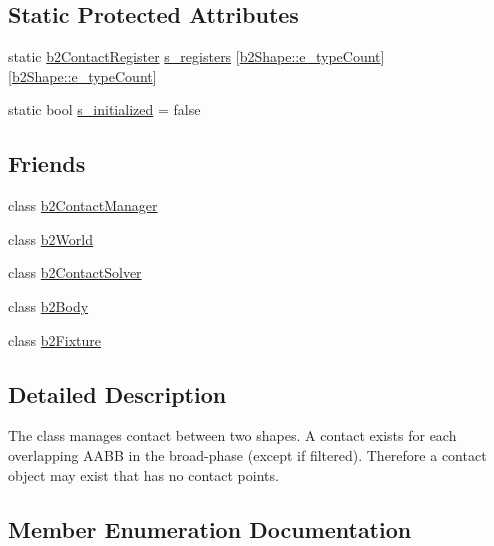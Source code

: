\subsection*{Static Protected Attributes}
\begin{DoxyCompactItemize}
\item 
static \mbox{\hyperlink{structb2_contact_register}{b2\+Contact\+Register}} \mbox{\hyperlink{classb2_contact_a5e2beb4e435e1545ae043a7a2b77d1da}{s\+\_\+registers}} \mbox{[}\mbox{\hyperlink{classb2_shape_a4c1f3a9ad6b3150bb90ad9018ca4b1e0aad7c674a33e8ca4ee9b717f226553596}{b2\+Shape\+::e\+\_\+type\+Count}}\mbox{]}\mbox{[}\mbox{\hyperlink{classb2_shape_a4c1f3a9ad6b3150bb90ad9018ca4b1e0aad7c674a33e8ca4ee9b717f226553596}{b2\+Shape\+::e\+\_\+type\+Count}}\mbox{]}
\item 
static bool \mbox{\hyperlink{classb2_contact_a672598c350694d7b9a89c45f8ad0dd90}{s\+\_\+initialized}} = false
\end{DoxyCompactItemize}
\subsection*{Friends}
\begin{DoxyCompactItemize}
\item 
class \mbox{\hyperlink{classb2_contact_aece264d42f69aed410f5eb3beba6ddf2}{b2\+Contact\+Manager}}
\item 
class \mbox{\hyperlink{classb2_contact_a4bd536c5a7c0587913765bbc2693ceea}{b2\+World}}
\item 
class \mbox{\hyperlink{classb2_contact_afb788a7ba90344f3ddbafff3de0465c4}{b2\+Contact\+Solver}}
\item 
class \mbox{\hyperlink{classb2_contact_a010ab52de250e5fe30a45d642f46405b}{b2\+Body}}
\item 
class \mbox{\hyperlink{classb2_contact_afb35b0e61f6ee3cc516c40ea251f3236}{b2\+Fixture}}
\end{DoxyCompactItemize}


\subsection{Detailed Description}
The class manages contact between two shapes. A contact exists for each overlapping A\+A\+BB in the broad-\/phase (except if filtered). Therefore a contact object may exist that has no contact points. 

\subsection{Member Enumeration Documentation}
\mbox{\label{classb2_contact_ab8f00a9c04b3eea54a9c5bab29328c3e}} 
